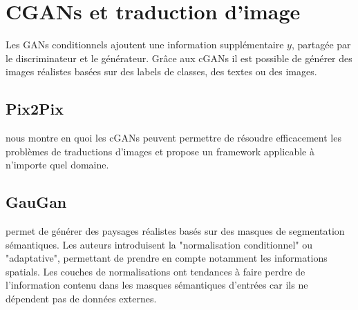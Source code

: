 \documentclass[a4paper, 12pt]{report}
\begin{document}
\section{CGANs et traduction d'image}

Les GANs conditionnels ajoutent une information supplémentaire $y$, partagée par le discriminateur et le générateur. Grâce aux cGANs il est possible de générer des images réalistes basées sur des labels de classes, des textes ou des images.

\subsection{Pix2Pix}
\cite{DBLP:journals/corr/GatysEB15a} nous montre en quoi les cGANs peuvent permettre de résoudre efficacement les problèmes de traductions d'images et propose un framework applicable à n'importe quel domaine.

\subsection{GauGan}
\cite{DBLP:journals/corr/abs-1903-07291} permet de générer des paysages réalistes basés sur des masques de segmentation sémantiques. Les auteurs introduisent la "normalisation conditionnel" ou "adaptative", permettant de prendre en compte notamment les informations spatials.
Les couches de normalisations ont tendances à faire perdre de l'information contenu dans les masques sémantiques d'entrées car ils ne dépendent pas de données externes.
\end{document}
